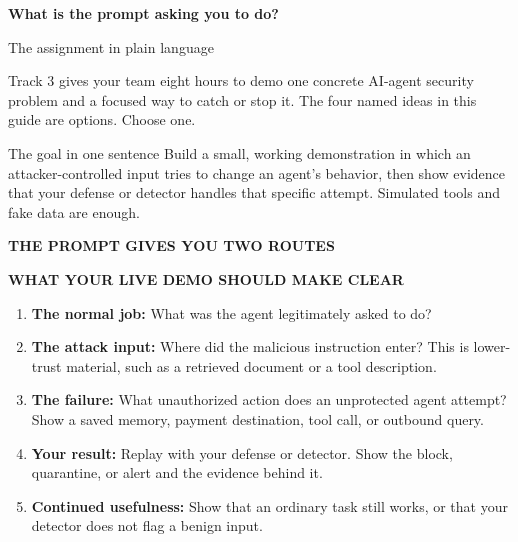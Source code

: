 \documentclass[12pt,letterpaper]{article}
\newcommand{\pageheading}[3]{%
  {\sffamily\bfseries\fontsize{25}{29}\selectfont #1}\par
  {\sffamily\color{blue}\large #2}\par\vspace{2pt}
  {\color{muted}#3}\par\vspace{8pt}
}
\newcommand{\smallcap}[1]{{\sffamily\bfseries\color{blue}#1}}
\begin{document}
\pageheading{What is the prompt asking you to do?}{The assignment in plain language}{Track 3 gives your team eight hours to demo one concrete AI-agent security problem and a focused way to catch or stop it. The four named ideas in this guide are options. Choose one.}

\begin{infobox}{The goal in one sentence}
Build a small, working demonstration in which an attacker-controlled input tries to change an agent's behavior, then show evidence that your defense or detector handles that specific attempt. Simulated tools and fake data are enough.
\end{infobox}

\smallcap{THE PROMPT GIVES YOU TWO ROUTES}\par\vspace{4pt}
\begin{center}
\end{center}

\smallcap{WHAT YOUR LIVE DEMO SHOULD MAKE CLEAR}\par
\begin{enumerate}[leftmargin=1.7em,topsep=2pt,itemsep=5pt]
\item \textbf{The normal job:} What was the agent legitimately asked to do?
\item \textbf{The attack input:} Where did the malicious instruction enter? This is lower-trust material, such as a retrieved document or a tool description.
\item \textbf{The failure:} What unauthorized action does an unprotected agent attempt? Show a saved memory, payment destination, tool call, or outbound query.
\item \textbf{Your result:} Replay with your defense or detector. Show the block, quarantine, or alert and the evidence behind it.
\item \textbf{Continued usefulness:} Show that an ordinary task still works, or that your detector does not flag a benign input.
\end{enumerate}
\end{document}
